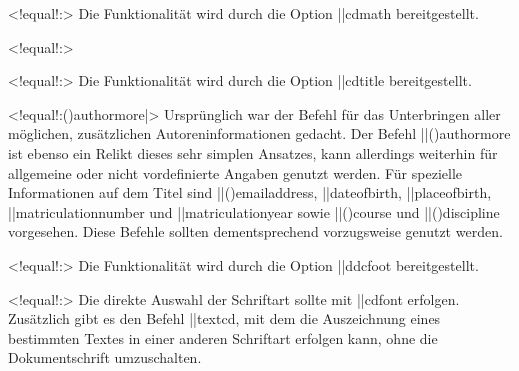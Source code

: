 \begin{DeclareEntity}{}
\begin{Declaration}
  {}
  <!equal!:>
\printdeclarationlist
%
Die Funktionalität wird durch die Option \Option||{cdmath} bereitgestellt.
\end{Declaration}

\begin{Declaration}
  {}
  <!equal!:>
\begin{Declaration}
  {}
  <!equal!:>
\printdeclarationlist
%
Die Funktionalität wird durch die Option \Option||{cdtitle} bereitgestellt.
\end{Declaration}
\end{Declaration}

\begin{Declaration}
  {}
  <!equal!:\Macro(){authormore|}>
\printdeclarationlist
%
Ursprünglich war der Befehl für das Unterbringen aller möglichen, zusätzlichen 
Autoreninformationen gedacht. Der Befehl \Macro||(){authormore} 
ist ebenso ein Relikt dieses sehr simplen Ansatzes, kann allerdings weiterhin 
für allgemeine oder nicht vordefinierte Angaben genutzt werden. Für spezielle 
Informationen auf dem Titel sind \Macro||(){emailaddress}, 
\Macro||{dateofbirth}, \Macro||{placeofbirth}, \Macro||{matriculationnumber} 
und \Macro||{matriculationyear} sowie \Macro||(){course} und 
\Macro||(){discipline} vorgesehen. Diese Befehle sollten 
dementsprechend vorzugsweise genutzt werden.
\end{Declaration}

\begin{Declaration}
  {}
  <!equal!:>
\printdeclarationlist
%
Die Funktionalität wird durch die Option \Option||{ddcfoot} bereitgestellt.
\end{Declaration}

\begin{Declaration}
  {}
  <!equal!:>
\printdeclarationlist
%
Die direkte Auswahl der Schriftart sollte mit \Macro||{cdfont} erfolgen. 
Zusätzlich gibt es den Befehl \Macro||{textcd}, mit dem die Auszeichnung 
eines bestimmten Textes in einer anderen Schriftart erfolgen kann, ohne die 
Dokumentschrift umzuschalten.
\end{Declaration}
%




\end{DeclareEntity}
